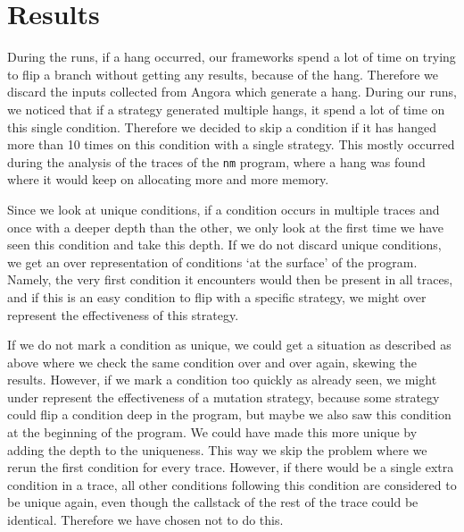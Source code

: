 \section{Results}
During the runs, if a hang occurred, our frameworks spend a lot of time on trying to flip a branch without getting any results, because of the hang. Therefore we discard the inputs collected from Angora which generate a hang. 
During our runs, we noticed that if a strategy generated multiple hangs, it spend a lot of time on this single condition. Therefore we decided to skip a condition if it has hanged more than 10 times on this condition with a single strategy. This mostly occurred during the analysis of the traces of the \texttt{nm} program, where a hang was found where it would keep on allocating more and more memory.



Since we look at unique conditions, if a condition occurs in multiple traces and once with a deeper depth than the other, we only look at the first time we have seen this condition and take this depth. If we do not discard unique conditions, we get an over representation of conditions `at the surface' of the program. Namely, the very first condition it encounters would then be present in all traces, and if this is an easy condition to flip with a specific strategy, we might over represent the effectiveness of this strategy.

If we do not mark a condition as unique, we could get a situation as described as above where we check the same condition over and over again, skewing the results. However, if we mark a condition too quickly as already seen, we might under represent the effectiveness of a mutation strategy, because some strategy could flip a condition deep in the program, but maybe we also saw this condition at the beginning of the program. We could have made this more unique by adding the depth to the uniqueness. This way we skip the problem where we rerun the first condition for every trace. However, if there would be a single extra condition in a trace, all other conditions following this condition are considered to be unique again, even though the callstack of the rest of the trace could be identical. Therefore we have chosen not to do this.

